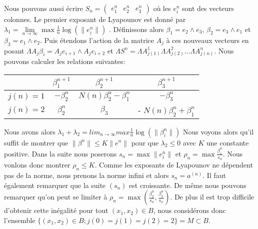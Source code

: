 \documentclass[12pt]{article}
\theoremstyle{plain}%
\theoremstyle{definition}
\theoremstyle{remark}
\begin{document}
Nous pouvons aussi écrire $S_n=\begin{pmatrix} e_1^n & e_2^n & e_3^n\end{pmatrix}$ où les $e_i^n$ sont des vecteurs colonnes.
 Le premier exposant de Lyapounov est donné par $\lambda_1= \underset{n\to \infty}{\lim} \max \frac{1}{n} \log(\|e_i^n\|)$ .\newline
 Définissons alors $\beta_1=e_2 \land e_3$, $\beta_2=e_3 \land e_1$ et $\beta_3=e_1 \land e_2$.
 Puis étendons l'action de la matrice $A_j$ à ces nouveaux vecteurs en posant $\Lambda A_j \beta_i=A_j e_{i+1} \land A_j e_{i+2}$ et $\Lambda S^n=\Lambda A_{j(1)}^1  \Lambda A_{j(2)}^2 ... \Lambda A_{j(n)}^n$. \newline
 Nous pouvons calculer les relations suivantes:
 \begin{center}
  \begin{tabular}{c|c|c|c|}
    & $\beta_1^{n+1}$ & $\beta_2^{n+1}$ & $\beta_3^{n+1}$\\
  \hline
  $j(n)=1$ & $-\beta_2^{n}$ & $N(n) \beta_2^n-\beta_1^n$ & $-\beta_3^n$ \\
  $j(n)=2$ & $\beta_2^{n}$ & $\beta_3$ & - $N(n) \beta_2^n+\beta_1^n$ \\
  \end{tabular}
  \end{center}
  Nous avons alors $\lambda_1 + \lambda_2= lim_{n\to \infty} max \frac{1}{n} \log(\|\beta_i^n\|)$ \newline
  Nous voyons alors qu'il suffit de montrer que $\|\beta^n\| \leq K \|e^n\|$ pour que $\lambda_2 \leq 0$ avec $K$ une constante positive. \newline
  Dans la suite nous poserons $s_n= \max \|e_i^n\|$ et $\rho_n=\max \frac{\beta_i^n}{s_n}$. Nous vonlons donc montrer $\rho_n \leq K$.\newline
  Comme les exposants de Lyapounov ne dépendent pas de la norme, nous prenons la norme infini et alors $s_n=a^{(n)}$. Il faut également remarquer que la suite $(s_n)$ est croissante.
  De même nous pouvons remarquer qu'on peut se limiter à $\rho_n= \max{(\frac{\beta_2^n}{s_n}, \frac{\beta_3^n}{s_n})}$. De plus il est trop difficile d'obtenir cette inégalité pour tout $(x_1,x_2) \in B$, nous considérons donc l'ensemble $\{(x_1,x_2)\in B;j(0)=j(1)=j(2)=2\}=M \subset B$.
\end{document}

